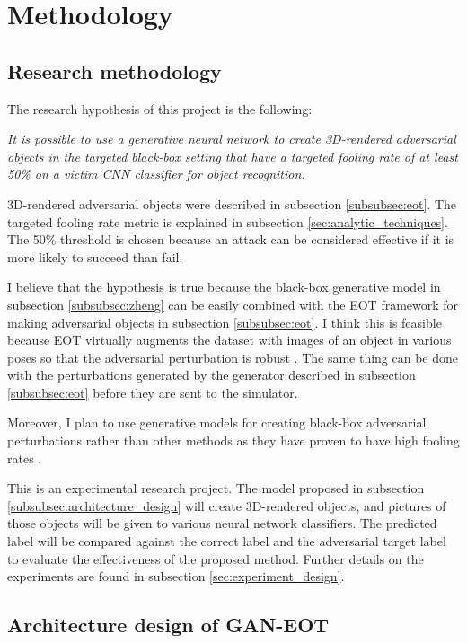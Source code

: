 \chapter{Methodology}
    \label{chap:methodology}
    
\section{Research methodology}

The research hypothesis of this project is the following: 

\textit{It is possible to use a generative neural network to create 3D-rendered adversarial objects in the targeted black-box setting that have a targeted fooling rate of at least 50\% on a victim CNN classifier for object recognition.}

\bigbreak
3D-rendered adversarial objects were described in subsection \ref{subsubsec:eot}. The targeted fooling rate metric is explained in subsection \ref{sec:analytic_techniques}. The 50\% threshold is chosen because an attack can be considered effective if it is more likely to succeed than fail.

I believe that the hypothesis is true because the black-box generative model in subsection \ref{subsubsec:zheng} can be easily combined with the EOT framework for making adversarial objects in subsection \ref{subsubsec:eot}. I think this is feasible because EOT virtually augments the dataset with images of an object in various poses so that the adversarial perturbation is robust \cite{athalye}. The same thing can be done with the perturbations generated by the generator described in subsection \ref{subsubsec:eot} before they are sent to the simulator.

Moreover, I plan to use generative models for creating black-box adversarial perturbations rather than other methods as they have proven to have high fooling rates \cite{upset_angri, zheng_black_box_GAN}.

This is an experimental research project. The model proposed in subsection \ref{subsubsec:architecture_design} will create 3D-rendered objects, and pictures of those objects will be given to various neural network classifiers. The predicted label will be compared against the correct label and the adversarial target label to evaluate the effectiveness of the proposed method. Further details on the experiments are found in subsection \ref{sec:experiment_design}.

\section{Architecture design of GAN-EOT}
    \label{sec:architecture_design}
    
